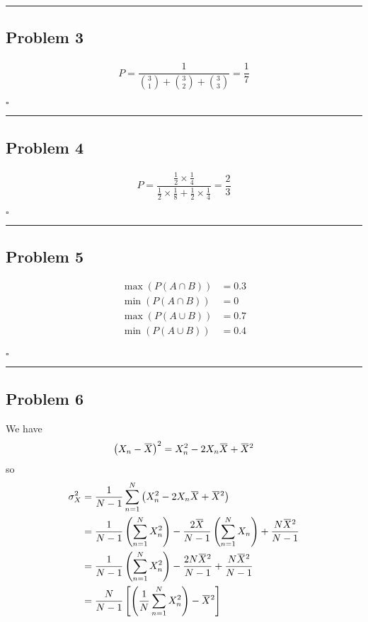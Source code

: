 \documentclass[12pt]{article}
\newcommand{\overbar}[1]{\mkern 1.5mu\overline{\mkern-1.5mu#1\mkern-1.5mu}\mkern 1.5mu}
\newcommand*{\QEDB}{\hfill\ensuremath{\square}}
\newcommand{\SBrackets}[1]{\left[#1\right]}
\newcommand{\ParTh}[1]{\left(#1\right)}
\newcommand{\horrule}[1]{\rule{\linewidth}{#1}}
\begin{document}
\horrule{0.5pt}

\subsection*{Problem 3}

\begin{align}
P=\dfrac{1}{\binom{3}{1}+\binom{3}{2}+\binom{3}{3}}=\dfrac{1}{7}
\end{align}

\QEDB

\horrule{0.5pt}

\subsection*{Problem 4}

\begin{align}
P=\dfrac{\frac{1}{2}\times\frac{1}{4}}{\frac{1}{2}\times\frac{1}{8}+\frac{1}{2}\times\frac{1}{4}}=\dfrac{2}{3}
\end{align}

\QEDB

\horrule{0.5pt}

\subsection*{Problem 5}

\begin{align}
\max\ParTh{P\ParTh{A\cap B}}&=0.3\\
\min\ParTh{P\ParTh{A\cap B}}&=0\\
\max\ParTh{P\ParTh{A\cup B}}&=0.7\\
\min\ParTh{P\ParTh{A\cup B}}&=0.4\\
\end{align}

\QEDB

\horrule{0.5pt}

\subsection*{Problem 6}

We have
\begin{align}
\ParTh{X_n-\overbar{X}}^2=X^2_n-2X_n\overbar{X}+\overbar{X}^2
\end{align}
so
\begin{align}
\sigma^2_X&=\dfrac{1}{N-1}\sum_{n=1}^{N}\ParTh{X^2_n-2X_n\overbar{X}+\overbar{X}^2}\\
&=\dfrac{1}{N-1}\ParTh{\sum_{n=1}^{N}X^2_n}-\dfrac{2\overbar{X}}{N-1}\ParTh{\sum_{n=1}^{N}X_n}+\dfrac{N\overbar{X}^2}{N-1}\\
&=\dfrac{1}{N-1}\ParTh{\sum_{n=1}^{N}X^2_n}-\dfrac{2N\overbar{X}^2}{N-1}+\dfrac{N\overbar{X}^2}{N-1}\\
&=\dfrac{N}{N-1}\SBrackets{\ParTh{\dfrac{1}{N}\sum_{n=1}^{N}X^2_n}-\overbar{X}^2}
\end{align}
\end{document}
